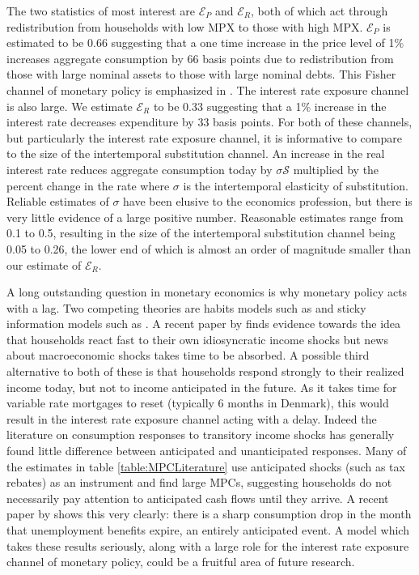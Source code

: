 \documentclass[titlepage]{\econtex}\newcommand{\texname}{ConsumptionHeterogeneity}
\begin{document}
The two statistics of most interest are $\mathcal{E}_P$ and $\mathcal{E}_R$, both of which act through redistribution from households with low MPX to those with high MPX. $\mathcal{E}_P$ is estimated to be 0.66 suggesting that a one time increase in the price level of 1\% increases aggregate consumption by 66 basis points due to redistribution from those with large nominal assets to those with large nominal debts. This Fisher channel of monetary policy is emphasized in \cite{doepke_inflation_2006}. The interest rate exposure channel is also large. We estimate  $\mathcal{E}_R$ to be 0.33 suggesting that a 1\% increase in the interest rate decreases expenditure by 33 basis points. For both of these channels, but particularly the interest rate exposure channel, it is informative to compare to the size of the intertemporal substitution channel. An increase in the real interest rate reduces aggregate consumption today by $\sigma \mathcal{S}$ multiplied by the percent change in the rate where $\sigma$ is the intertemporal elasticity of substitution. Reliable estimates of $\sigma$ have been elusive to the economics profession, but there is very little evidence of a large positive number. Reasonable estimates range from 0.1 to 0.5, resulting in the size of the intertemporal substitution channel being 0.05 to 0.26, the lower end of which is almost an order of magnitude smaller than our estimate of $\mathcal{E}_R$.
\begin{center}
	\label{table:suff_stats}
	
\end{center}
A long outstanding question in monetary economics is why monetary policy acts with a lag. Two competing theories are habits models such as \cite{fuhrer_habit_2000} and sticky information models such as \cite{mankiw_sticky_2002}. A recent paper by \cite{carroll_sticky_2018} finds evidence towards the idea that households react fast to their own idiosyncratic income shocks but news about macroeconomic shocks takes time to be absorbed. A possible third alternative to both of these is that households respond strongly to their realized income today, but not to income anticipated in the future. As it takes time for variable rate mortgages to reset (typically 6 months in Denmark), this would result in the interest rate exposure channel acting with a delay. Indeed the literature on consumption responses to transitory income shocks has generally found little difference between anticipated and unanticipated responses. Many of the estimates in table \ref{table:MPCLiterature} use anticipated shocks (such as tax rebates) as an instrument and find large MPCs, suggesting households do not necessarily pay attention to anticipated cash flows until they arrive. A recent paper by \cite{ganong_consumer_2017} shows this very clearly: there is a sharp consumption drop in the month that unemployment benefits expire, an entirely anticipated event. A model which takes these results seriously, along with a large role for the interest rate exposure channel of monetary policy, could be a fruitful area of future research. 
\end{document}
